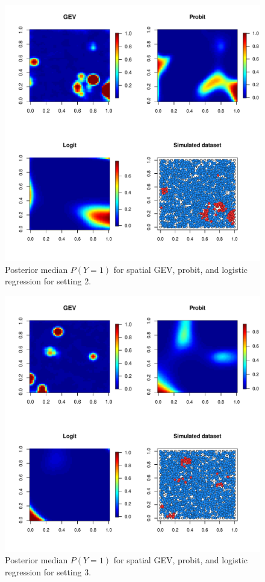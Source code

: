 \documentclass[11pt]{article}
\begin{document}
\begin{figure}
  \includegraphics[width=\linewidth]{plots/post-med-2.pdf}
  \caption{Posterior median $P(Y = 1)$ for spatial GEV, probit, and logistic regression for setting 2.}
  \label{fig:post-med-2}
\end{figure}

\begin{figure}
  \includegraphics[width=\linewidth]{plots/post-med-3.pdf}
  \caption{Posterior median $P(Y = 1)$ for spatial GEV, probit, and logistic regression for setting 3.}
  \label{fig:post-med-3}
\end{figure}
\end{document}
